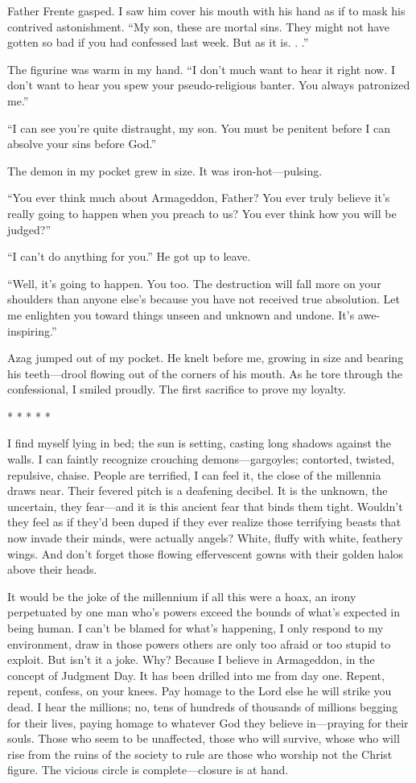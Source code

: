 \documentclass[
]{article}
\begin{document}
Father Frente gasped. I saw him cover his mouth with his hand as if to
mask his contrived astonishment. ``My son, these are mortal sins. They
might not have gotten so bad if you had confessed last week. But as it
is. . .''

The figurine was warm in my hand. ``I don't much want to hear it right
now. I don't want to hear you spew your pseudo-religious banter. You
always patronized me.''

``I can see you're quite distraught, my son. You must be penitent before
I can absolve your sins before God.''

The demon in my pocket grew in size. It was iron-hot---pulsing.

``You ever think much about Armageddon, Father? You ever truly believe
it's really going to happen when you preach to us? You ever think how
you will be judged?''

``I can't do anything for you.'' He got up to leave.

``Well, it's going to happen. You too. The destruction will fall more on
your shoulders than anyone else's because you have not received true
absolution. Let me enlighten you toward things unseen and unknown and
undone. It's awe-inspiring.''

Azag jumped out of my pocket. He knelt before me, growing in size and
bearing his teeth---drool flowing out of the corners of his mouth. As he
tore through the confessional, I smiled proudly. The first sacrifice to
prove my loyalty.

* * * * *

I find myself lying in bed; the sun is setting, casting long shadows
against the walls. I can faintly recognize crouching demons---gargoyles;
contorted, twisted, repulsive, chaise. People are terrified, I can feel
it, the close of the millennia draws near. Their fevered pitch is a
deafening decibel. It is the unknown, the uncertain, they fear---and it
is this ancient fear that binds them tight. Wouldn't they feel as if
they'd been duped if they ever realize those terrifying beasts that now
invade their minds, were actually angels? White, fluffy with white,
feathery wings. And don't forget those flowing effervescent gowns with
their golden halos above their heads.

It would be the joke of the millennium if all this were a hoax, an irony
perpetuated by one man who's powers exceed the bounds of what's expected
in being human. I can't be blamed for what's happening, I only respond
to my environment, draw in those powers others are only too afraid or
too stupid to exploit. But isn't it a joke. Why? Because I believe in
Armageddon, in the concept of Judgment Day. It has been drilled into me
from day one. Repent, repent, confess, on your knees. Pay homage to the
Lord else he will strike you dead. I hear the millions; no, tens of
hundreds of thousands of millions begging for their lives, paying homage
to whatever God they believe in---praying for their souls. Those who
seem to be unaffected, those who will survive, whose who will rise from
the ruins of the society to rule are those who worship not the Christ
figure. The vicious circle is complete---closure is at hand.
\end{document}
